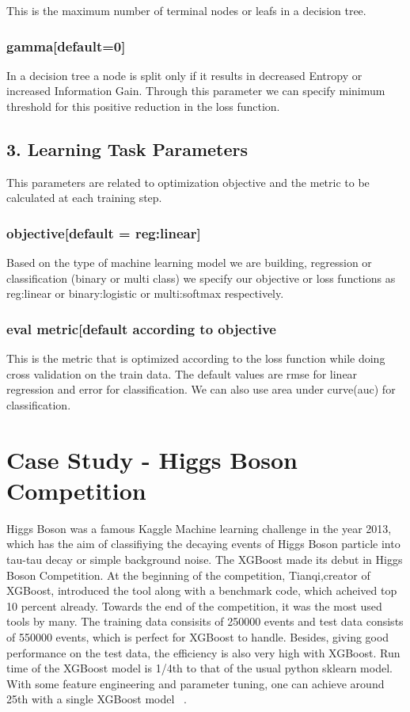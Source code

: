 This is the maximum number of terminal nodes or leafs in a decision tree.

\subsubsection{gamma[default=0]} 

In a decision tree a node is split only if it results in decreased Entropy or
increased  Information Gain. Through this parameter  we can specify minimum
threshold for this positive  reduction in the loss function.

\subsection{3. Learning Task Parameters} 

This parameters are related to optimization objective and the metric to be
calculated at each training step.

\subsubsection{objective[default = reg:linear]}

Based on the type of machine learning model we are building, regression or
classification (binary or multi class) we specify our objective or loss
functions as reg:linear or binary:logistic or  multi:softmax respectively.

\subsubsection{eval metric[default according to objective}

This is the metric that is optimized according to the loss function while doing
cross  validation on the train data. The default values are rmse for linear
regression and  error  for classification. We can also use area under curve(auc)
for classification.

\section{Case Study - Higgs Boson Competition}

Higgs Boson was a famous Kaggle Machine learning challenge in the year 2013,
which has the  aim of classifiying the decaying events of Higgs Boson particle
into tau-tau decay or simple  background noise. The XGBoost made its debut in
Higgs Boson Competition. At the beginning of  the competition, Tianqi,creator of
XGBoost, introduced the tool along with a benchmark code,  which acheived top 10
percent already. Towards the end of the competition, it was the most used tools
by many.
The training data consisits of 250000 events and test data consists of
550000 events, which is perfect for XGBoost to handle. Besides, giving good
performance on the test data, the efficiency is also very high with XGBoost. Run
time of the XGBoost model is 1/4th to that of the usual python sklearn model.
With some feature engineering and parameter tuning, one can achieve around 25th
with a single XGBoost model ~\cite{hid-sp18-401-XGBoost-pdf}.

